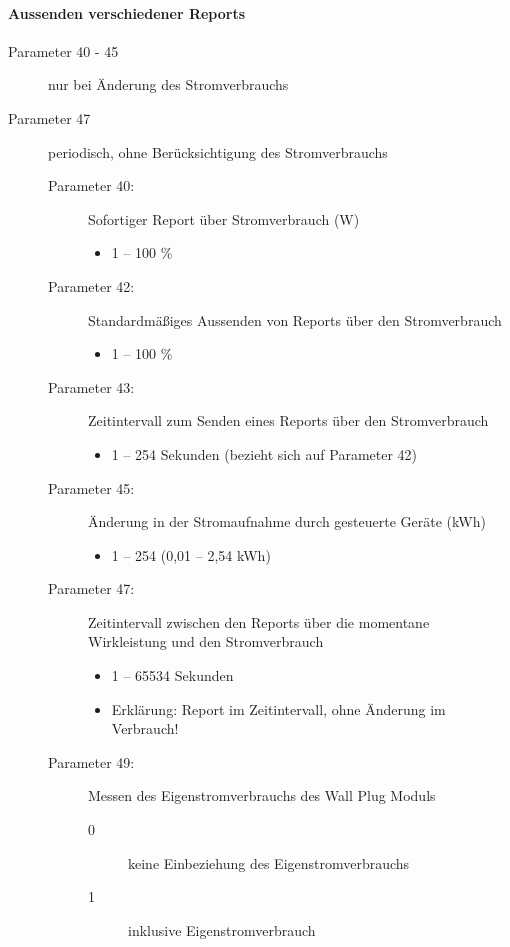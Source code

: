 \paragraph{Aussenden verschiedener Reports}
\begin{description}
	\item [Parameter 40 - 45] nur bei Änderung des Stromverbrauchs
	\item [Parameter 47] periodisch, ohne Berücksichtigung des Stromverbrauchs
	\begin{description}
		\item [Parameter 40:] Sofortiger Report über Stromverbrauch (W)
		\begin{itemize}
			\item 1 – 100 \%
		\end{itemize}
		\item [Parameter 42:] Standardmäßiges Aussenden von Reports über den Stromverbrauch
		\begin{itemize}
			\item 1 – 100 \%
		\end{itemize}
		\item [Parameter 43:] Zeitintervall zum Senden eines Reports über den Stromverbrauch
		\begin{itemize}
			\item 1 – 254 Sekunden (bezieht sich auf Parameter 42)
		\end{itemize}
		\item [Parameter 45:] Änderung in der Stromaufnahme durch gesteuerte Geräte (kWh)
		\begin{itemize}
			\item 1 – 254 (0,01 – 2,54 kWh)
		\end{itemize}
		\item [Parameter 47:] Zeitintervall zwischen den Reports über die momentane Wirkleistung und den Stromverbrauch
		\begin{itemize}
			\item 1 – 65534 Sekunden
			\item Erklärung: Report im Zeitintervall, ohne Änderung im Verbrauch!
		\end{itemize}
		\item [Parameter 49:] Messen des Eigenstromverbrauchs des Wall Plug Moduls
		\begin{description}
			\item [0] keine Einbeziehung des Eigenstromverbrauchs
			\item [1] inklusive Eigenstromverbrauch
		\end{description}
	\end{description}
\end{description}

